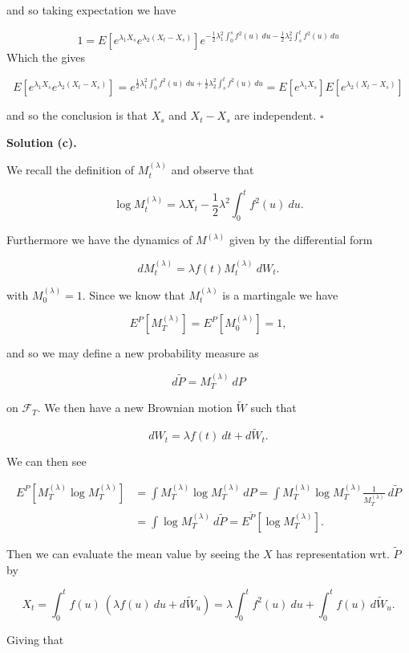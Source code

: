 \documentclass[
]{article}
\begin{document}
and so taking expectation we have

\[
1=E[e^{\lambda_1X_s}e^{\lambda_2(X_t-X_s)}]e^{-\frac{1}{2}\lambda_1^2\int_0^s f^2(u)\ du-\frac{1}{2}\lambda_2^2\int_s^t f^2(u)\ du}
\] Which the gives

\[
E[e^{\lambda_1X_s}e^{\lambda_2(X_t-X_s)}]=e^{\frac{1}{2}\lambda_1^2\int_0^s f^2(u)\ du+\frac{1}{2}\lambda_2^2\int_s^t f^2(u)\ du}=E[e^{\lambda_1X_s}]E[e^{\lambda_2(X_t-X_s)}]
\]

and so the conclusion is that \(X_s\) and \(X_t-X_s\) are independent.
\(\square\)

\textbf{Solution (c).}

We recall the definition of \(M_t^{(\lambda)}\) and observe that

\[
\log M_t^{(\lambda)}=\lambda X_t-\frac{1}{2}\lambda ^2\int_0^t f^2(u)\ du.
\]

Furthermore we have the dynamics of \(M^{(\lambda)}\) given by the
differential form

\[
dM_t^{(\lambda)}=\lambda f(t)M_t^{(\lambda)}\ dW_t.
\]

with \(M_0^{(\lambda)}=1\). Since we know that \(M_t^{(\lambda)}\) is a
martingale we have

\[
E^P[M_T^{(\lambda)}]=E^P[M_0^{(\lambda)}]=1,
\]

and so we may define a new probability measure as

\[
d\tilde{P}=M_T^{(\lambda)}\ dP
\]

on \(\mathcal{F}_T\). We then have a new Brownian motion \(\tilde{W}\)
such that

\[
dW_t=\lambda f(t)\ dt + d\tilde{W}_t.
\]

We can then see

\begin{align*}
E^P[M_T^{(\lambda)}\log M_T^{(\lambda)}]&=\int M_T^{(\lambda)}\log M_T^{(\lambda)}\ dP=\int M_T^{(\lambda)}\log M_T^{(\lambda)} \frac{1}{M_T^{(\lambda)}}\ d\tilde{P}\\
&=\int \log M_T^{(\lambda)}\ d\tilde{P}=E^{\tilde{P}}[\log M_T^{(\lambda)}].
\end{align*}

Then we can evaluate the mean value by seeing the \(X\) has
representation wrt. \(\tilde{P}\) by

\[
X_t=\int_0^tf(u)\ (\lambda f(u)\ du + d\tilde{W}_u)=\lambda\int_0^tf^2(u)\ du+\int_0^tf(u)\ d\tilde{W}_u.
\]

Giving that
\end{document}
